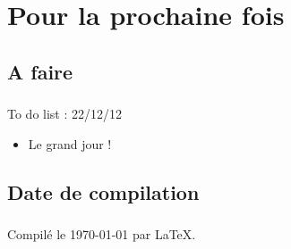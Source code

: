 \section{Pour la prochaine fois}

\begin{frame}
\sectionFrame{}
\end{frame}

	\subsection{A faire}
	
	
	\begin{frame}
	\frametitle{\insertsection}
		\begin{block}{To do list : 22/12/12}
			\begin{itemize}
			\item Le grand jour !
			\end{itemize}
		\end{block}
	\end{frame}

	\subsection{Date de compilation}
	
	\begin{frame}
	\frametitle{\insertsection}
		
		\begin{center}
		Compilé le \today{} par \LaTeX{}.
		\end{center}	

	\end{frame}